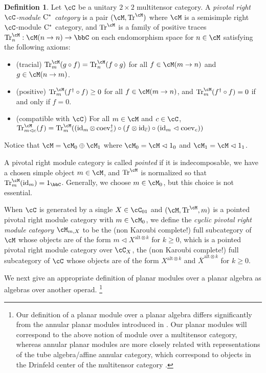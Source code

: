 \documentclass[11pt]{article}
\theoremstyle{plain}
\theoremstyle{definition}
\newtheorem{defn}[thm]{Definition}
\DeclareMathOperator{\coev}{coev}
\DeclareMathOperator{\id}{id}
\DeclareMathOperator{\Tr}{Tr}
\newcommand{\Cstar}{\rm{C^*}}
\begin{document}
\begin{defn}
Let $\cC$ be a unitary $2\times 2$ multitensor category.
A \emph{pivotal right $\cC$-module $\Cstar$ category} is a pair $(\cM,\Tr^\cM)$ where
$\cM$ is a semisimple right $\cC$-module $\Cstar$ category, and $\Tr^\cM$ is a family of positive traces $\Tr^\cM_n:\cM(n \to n)\to \bbC$ on each endomorphism space for $n\in \cM$ satisfying the following axioms:
\begin{itemize}
\item
(tracial)
$\Tr^\cM_m(g \circ f) = \Tr^\cM_n(f\circ g)$ for all $f\in \cM(m\to n)$ and $g\in \cM(n \to m)$.
\item
(positive)
$\Tr^\cM_m(f^\dag \circ f) \geq 0$ for all $f\in \cM(m \to n)$, and $\Tr^\cM_m(f^\dag \circ f) =0$ if and only if $f = 0$.
\item
(compatible with $\cC$)
For all $m\in \cM$ and $c\in \cC$,
$
\Tr^\cM_{m\vartriangleleft c}(f)
=
\Tr^\cM_{m}(
(\id_m \otimes \coev_c^\dag) \circ (f\otimes \id_{\overline{c}}) \circ (\id_m \vartriangleleft \coev_c)
)
$
\end{itemize}
Notice that $\cM = \cM_0 \oplus \cM_1$ where $\cM_0 = \cM \vartriangleleft 1_0$ and $\cM_1 = \cM\vartriangleleft 1_1$.

A pivotal right module category is called \emph{pointed} if it is indecomposable, we have a chosen simple object $m\in \cM$, and $\Tr^\cM$ is normalized so that $\Tr^\cM_m(\id_m) = 1_\bbC$.
Generally, we choose $m\in \cM_0$, but this choice is not essential.

When $\cC$ is generated by a single $X\in \cC_{01}$ and $(\cM,\Tr^\cM,m)$ is a pointed pivotal right module category with $m\in \cM_0$, we define the \emph{cyclic pivotal right module category} $\cM_{m,X}$ to be the (non Karoubi complete!) full subcategory of $\cM$ whose objects are of the form 
$
m \vartriangleleft X^{ \text{alt}\otimes k}
$ 
for $k\geq 0$, which is a pointed pivotal right module category over $\cC_X$, the (non Karoubi complete!) full subcategory of $\cC$ whose objects are of the form $X^{ \text{alt}\otimes k}$ and $\overline{X}^{ \text{alt}\otimes k}$ for $k\geq 0$.
\end{defn}


We next give an appropriate definition of planar modules over a planar algebra as algebras over another operad.
\footnote{
Our definition of a planar module over a planar algebra differs significantly from the annular planar modules introduced in \cite{MR1929335}. 
Our planar modules will correspond to the above notion of module over a multitensor category, 
whereas annular planar modules 
are more closely related with representations of the tube algebra/affine annular category, which correspond to objects in the Drinfeld center of the multitensor category \cite{MR3447719}.
}
\end{document}
